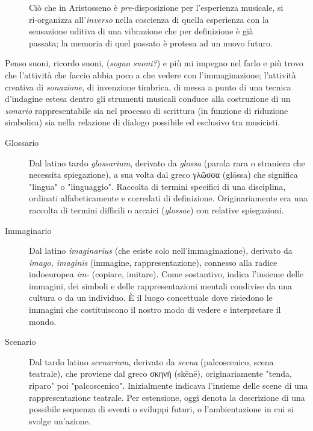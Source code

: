 \begin{figure}[htbp]
\begin{center}
\caption{Ciò che in Aristosseno è \emph{pre}-disposizione per l'esperienza
musicale, si ri-organizza all'\emph{inverso} \cite{bergson:segno} nella coscienza
di quella esperienza con la sensazione uditiva di una vibrazione che per
definizione è già passata; la memoria di quel passato è protesa ad un nuovo futuro.}
\label{coscienza}
\end{center}
\end{figure}

Penso suoni, ricordo suoni, (\emph{sogno suoni?}) e più mi impegno nel farlo e
più trovo che l'attività che faccio abbia poco a che vedere con l'immaginazione;
l'attività creativa di \emph{sonazione}, di invenzione timbrica, di messa a
punto di una tecnica d'indagine estesa dentro gli strumenti musicali
\cite{netti23} conduce alla costruzione di un \emph{sonario} rappresentabile sia
nel processo di scrittura (in funzione di riduzione simbolica) sia nella
relazione di dialogo possibile ed esclusivo tra musicisti.

\begin{description}
  \item[Glossario] Dal latino tardo \emph{glossarium}, derivato da \emph{glossa}
  (parola rara o straniera che necessita spiegazione), a sua volta dal greco
  \textgreek{γλῶσσα} (glōssa) che significa "lingua" o "linguaggio". Raccolta di
  termini specifici di una disciplina, ordinati alfabeticamente e corredati di
  definizione. Originariamente era una raccolta di termini difficili o arcaici
  (\emph{glossae}) con relative spiegazioni.
  \item[Immaginario] Dal latino \emph{imaginarius} (che esiste solo
  nell'immaginazione), derivato da \emph{imago, imaginis} (immagine,
  rappresentazione), connesso alla radice indoeuropea \emph{im-} (copiare,
  imitare). Come sostantivo, indica l'insieme delle immagini, dei simboli e
  delle rappresentazioni mentali condivise da una cultura o da un individuo. È
  il luogo concettuale dove risiedono le immagini che costituiscono il nostro
  modo di vedere e interpretare il mondo.
  \item[Scenario] Dal tardo latino \emph{scenarium}, derivato da \emph{scena}
  (palcoscenico, scena teatrale), che proviene dal greco \textgreek{σκηνή}
  (skēnē), originariamente "tenda, riparo" poi "palcoscenico". Inizialmente
  indicava l'insieme delle scene di una rappresentazione teatrale. Per
  estensione, oggi denota la descrizione di una possibile sequenza di eventi o
  sviluppi futuri, o l'ambientazione in cui si svolge un'azione.
\end{description}

